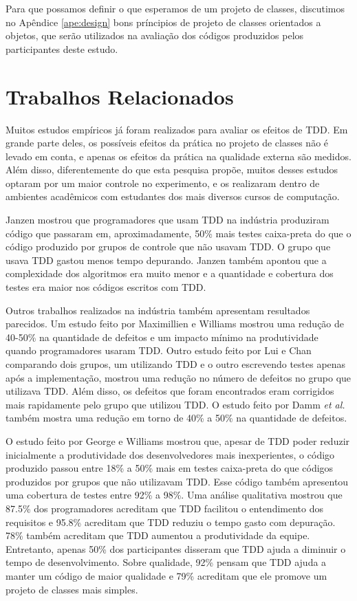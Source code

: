 \documentclass[conference]{IEEEtran}
\begin{document}
Para que possamos definir o que esperamos de um projeto de classes,
discutimos no Apêndice \ref{ape:design}
bons príncipios de projeto de classes orientados a objetos, que serão utilizados
na avaliação dos códigos produzidos pelos participantes deste estudo.

\section{Trabalhos Relacionados}
\label{cap:trabalhos-relacionados}

Muitos estudos empíricos já foram realizados para avaliar os efeitos de TDD.
Em grande parte deles, os possíveis efeitos da prática no projeto de classes não é 
levado em conta, e apenas os efeitos da prática na qualidade externa são medidos.
Além disso, diferentemente
do que esta pesquisa propõe, muitos desses estudos optaram por um
maior controle no experimento, e os realizaram dentro de ambientes acadêmicos 
com estudantes dos mais diversos cursos de computação.

Janzen \cite{janzen-arch-improvement} mostrou que programadores que usam TDD na 
indústria produziram código que passaram em, aproximadamente, 50\% mais testes 
caixa-preta do que o código produzido por grupos de controle que não usavam TDD.
O grupo que usava TDD gastou menos tempo depurando. Janzen também 
apontou que a complexidade dos algoritmos era muito menor e a quantidade e
cobertura dos testes era maior nos códigos escritos com TDD.

Outros trabalhos realizados na indústria também apresentam resultados parecidos.
Um estudo feito por Maximillien e Williams \cite{max-e-williams} mostrou uma
redução de 40-50\% na quantidade de defeitos e um impacto mínimo na
produtividade quando programadores usaram TDD. Outro estudo feito por Lui e
Chan \cite{lui-e-chan} comparando dois grupos, um utilizando TDD e o outro 
escrevendo testes apenas após a implementação, mostrou uma redução  
no número de defeitos no grupo que utilizava TDD. 
Além disso, os defeitos que foram encontrados eram 
corrigidos mais rapidamente pelo grupo que utilizou TDD. O estudo feito por 
Damm \textit{et al.} \cite{damn-lundberg-e-olson} também mostra uma redução
em torno de 40\% a 50\% na quantidade de defeitos.

O estudo feito por George e Williams \cite{george-e-williams} mostrou que,
apesar de TDD poder reduzir inicialmente a produtividade dos desenvolvedores 
mais inexperientes, o código produzido passou entre 18\% a 50\% mais em testes 
caixa-preta do que códigos produzidos por grupos que não utilizavam TDD. Esse
código também apresentou uma cobertura de testes entre 92\% a 98\%. Uma análise
qualitativa mostrou que 87.5\% dos programadores acreditam que TDD facilitou o 
entendimento dos requisitos e 95.8\% acreditam que TDD reduziu o tempo gasto com
depuração. 78\% também acreditam que TDD aumentou a produtividade da equipe. 
Entretanto, apenas 50\% dos participantes disseram que TDD ajuda a diminuir o tempo de 
desenvolvimento. Sobre qualidade, 92\% pensam que TDD ajuda a manter um
código de maior qualidade e 79\% acreditam que ele promove um projeto de classes mais simples.
\end{document}
